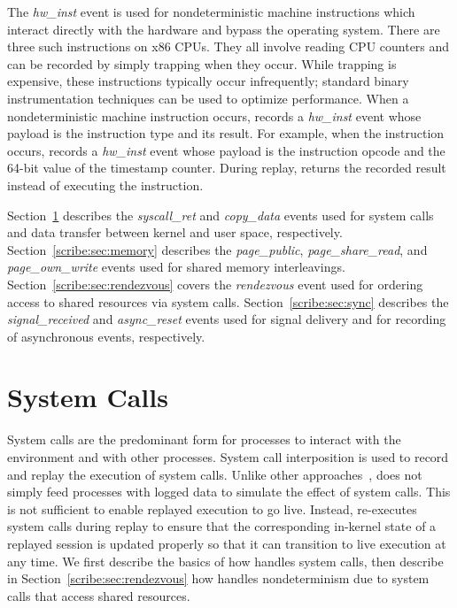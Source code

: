The {\em hw\_inst} event is used for nondeterministic machine
instructions which interact directly with the hardware and bypass the
operating system.  There are three such instructions on x86 CPUs.
They all involve reading CPU counters and can be recorded by simply
trapping when they occur.  While trapping is expensive, these
instructions typically occur infrequently; standard binary
instrumentation techniques can be used to optimize performance. 
When a nondeterministic machine instruction occurs, \scribe{} records
a {\em hw\_inst} event whose payload is the instruction type and
its result.  For example, when the  instruction occurs,
\scribe{} records a {\em hw\_inst} event whose payload is the
 instruction opcode and the 64-bit value of the timestamp
counter.  During replay, \scribe{} returns the recorded result
instead of executing the instruction.

Section~\ref{scribe:sec:syscalls} describes the {\em syscall\_ret} and {\em
  copy\_data} events used for system calls and data transfer between
kernel and user space,
respectively.
Section~\ref{scribe:sec:memory} describes the {\em page\_public}, {\em
  page\_share\_read}, and {\em page\_own\_write} events used for
shared memory interleavings.  Section~\ref{scribe:sec:rendezvous} covers
the {\em rendezvous} event used for ordering access to shared
resources via system calls. Section~\ref{scribe:sec:sync} describes the {\em
  signal\_received} and {\em async\_reset} events used for signal
delivery and for recording of asynchronous events, respectively.

 	
  

\section{System Calls}
\label{scribe:sec:syscalls}

System calls are the predominant form for processes to interact with
the environment and with other processes. System call interposition is
used to record and replay the execution of system calls.
Unlike other approaches~\cite{liblog,jockey,flashback}, \scribe{} does
not simply feed processes with logged data to simulate the effect of
system calls.  This is not sufficient to enable replayed execution to
go live.  Instead, \scribe{} re-executes system calls during replay to
ensure that the corresponding in-kernel state of a replayed session is
updated properly so that it can transition to live execution at any
time.  We first describe the basics of how \scribe{} handles system
calls, then describe in Section~\ref{scribe:sec:rendezvous} how \scribe{}
handles nondeterminism due to system calls that access shared
resources. 

